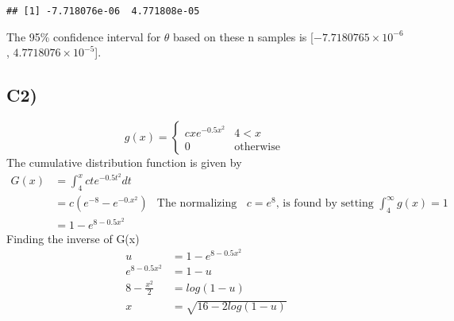 \documentclass[
]{article}
\begin{document}
\begin{verbatim}
## [1] -7.718076e-06  4.771808e-05
\end{verbatim}

The 95\% confidence interval for \(\theta\) based on these n samples is
{[}\ensuremath{-7.7180765\times 10^{-6}},
\ensuremath{4.7718076\times 10^{-5}}{]}.

\hypertarget{c2}{%
\subsection{C2)}\label{c2}}

\[
g(x)= \begin{cases} 
      cxe^{-0.5x^2} & 4< x \\
      0 & \text{otherwise }
   \end{cases}
\] The cumulative distribution function is given by \[
\begin{aligned}
G(x)&=\int_4^xcte^{-0.5t^2}dt\\
&=c (e^{-8}-e^{-0.x^2}) & \text{The normalizing constant, } &c=e^8 \text{, is found by setting } \int_4^\infty g(x)=1\\
&=1-e^{8-0.5x^2}
\end{aligned}
\] Finding the inverse of G(x) \[
\begin{aligned}
u&=1-e^{8-0.5x^2}\\
e^{8-0.5x^2}&=1-u\\
8-\frac{x^2}{2}&=log(1-u)\\
x&=\sqrt{16-2log(1-u)}
\end{aligned}
\]
\end{document}
